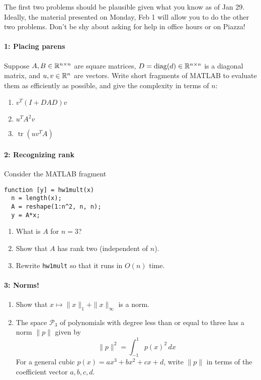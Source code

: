 \documentclass[12pt, leqno]{article}
\begin{document}

The first two problems should be plausible given what you know as of
Jan 29.  Ideally, the material presented on Monday, Feb 1 will allow
you to do the other two problems.  Don't be shy about asking for help
in office hours or on Piazza!

\paragraph*{1: Placing parens}
Suppose $A, B \in \mathbb{R}^{n \times n}$ are square matrices,
$D = \operatorname{diag}(d) \in \mathbb{R}^{n \times n}$ is a diagonal matrix,
and $u, v \in \mathbb{R}^n$ are vectors.  Write short
fragments of MATLAB to evaluate them as efficiently
as possible, and give the complexity in terms of $n$:
\begin{enumerate}
\item $v^T (I + D A D) v$
\item $u^T A^2 v$
\item $\operatorname{tr}(uv^T A)$
\end{enumerate}

\paragraph*{2: Recognizing rank}
Consider the MATLAB fragment

\lstset{language=matlab,frame=lines,columns=flexible}
\begin{lstlisting}
function [y] = hw1mult(x)
  n = length(x);
  A = reshape(1:n^2, n, n);
  y = A*x;
\end{lstlisting}

\begin{enumerate}
\item What is $A$ for $n = 3$?
\item Show that $A$ has rank two (independent of $n$).
\item Rewrite {\tt hw1mult} so that it runs in $O(n)$ time.
\end{enumerate}

\paragraph*{3: Norms!}
\begin{enumerate}
\item
  Show that $x \mapsto \|x\|_1 + \|x\|_\infty$ is a norm.
\item
  The space $\mathcal{P}_3$ of polynomials with degree less than or
  equal to three has a norm $\|p\|$ given by
  \[
    \|p\|^2 = \int_{-1}^1 p(x)^2 \, dx
  \]
  For a general cubic $p(x) = ax^3 + bx^2 + cx + d$, write $\|p\|$
  in terms of the coefficient vector $a, b, c, d$.
\end{enumerate}
\end{document}
